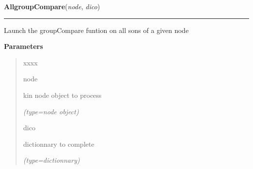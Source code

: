     \vspace{0.5ex}

\hspace{.8\funcindent}\begin{boxedminipage}{\funcwidth}

    \raggedright \textbf{AllgroupCompare}(\textit{node}, \textit{dico})

    \vspace{-1.5ex}

    \rule{\textwidth}{0.5\fboxrule}
\setlength{\parskip}{2ex}
    Launch the groupCompare funtion on all sons of a given node

\setlength{\parskip}{1ex}
      \textbf{Parameters}
      \vspace{-1ex}

      \begin{quote}
        \begin{Ventry}{xxxx}

          \item[node]

          kin node object to process

            {\it (type=node object)}

          \item[dico]

          dictionnary to complete

            {\it (type=dictionnary)}

        \end{Ventry}

      \end{quote}

    \end{boxedminipage}

    \label{script-phyloFixedVar:addANN}

    \vspace{0.5ex}

